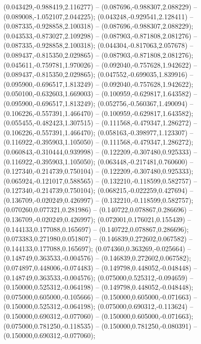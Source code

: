  (0.043429,-0.988419,2.116277) -- (0.087696,-0.988307,2.088229) -- (0.089008,-1.052107,2.044225);
 (0.043248,-0.929541,2.128411) -- (0.087335,-0.928858,2.100318) -- (0.087696,-0.988307,2.088229);
 (0.043533,-0.873027,2.109298) -- (0.087903,-0.871808,2.081276) -- (0.087335,-0.928858,2.100318);
 (0.044304,-0.817063,2.057678) -- (0.089437,-0.815350,2.029865) -- (0.087903,-0.871808,2.081276);
 (0.045611,-0.759781,1.970026) -- (0.092040,-0.757628,1.942622) -- (0.089437,-0.815350,2.029865);
 (0.047552,-0.699035,1.839916) -- (0.095900,-0.696517,1.813249) -- (0.092040,-0.757628,1.942622);
 (0.050100,-0.632603,1.669003) -- (0.100959,-0.629817,1.643582) -- (0.095900,-0.696517,1.813249);
 (0.052756,-0.560367,1.490094) -- (0.106226,-0.557391,1.466470) -- (0.100959,-0.629817,1.643582);
 (0.055455,-0.482423,1.307515) -- (0.111568,-0.479347,1.286272) -- (0.106226,-0.557391,1.466470);
 (0.058163,-0.398977,1.123307) -- (0.116922,-0.395903,1.105050) -- (0.111568,-0.479347,1.286272);
 (0.060843,-0.310444,0.939998) -- (0.122209,-0.307480,0.925333) -- (0.116922,-0.395903,1.105050);
 (0.063448,-0.217481,0.760600) -- (0.127340,-0.214739,0.750104) -- (0.122209,-0.307480,0.925333);
 (0.065924,-0.121017,0.588565) -- (0.132210,-0.118599,0.582757) -- (0.127340,-0.214739,0.750104);
 (0.068215,-0.022259,0.427694) -- (0.136709,-0.020249,0.426997) -- (0.132210,-0.118599,0.582757);
 (0.070260,0.077321,0.281986) -- (0.140722,0.078867,0.286696) -- (0.136709,-0.020249,0.426997);
 (0.072001,0.176021,0.155439) -- (0.144133,0.177088,0.165697) -- (0.140722,0.078867,0.286696);
 (0.073383,0.271980,0.051807) -- (0.146839,0.272602,0.067582) -- (0.144133,0.177088,0.165697);
 (0.074360,0.363269,-0.025664) -- (0.148749,0.363533,-0.004576) -- (0.146839,0.272602,0.067582);
 (0.074897,0.448006,-0.074483) -- (0.149798,0.448052,-0.048448) -- (0.148749,0.363533,-0.004576);
 (0.075000,0.525312,-0.094659) -- (0.150000,0.525312,-0.064198) -- (0.149798,0.448052,-0.048448);
 (0.075000,0.605000,-0.105666) -- (0.150000,0.605000,-0.071663) -- (0.150000,0.525312,-0.064198);
 (0.075000,0.690312,-0.113624) -- (0.150000,0.690312,-0.077060) -- (0.150000,0.605000,-0.071663);
 (0.075000,0.781250,-0.118535) -- (0.150000,0.781250,-0.080391) -- (0.150000,0.690312,-0.077060);
